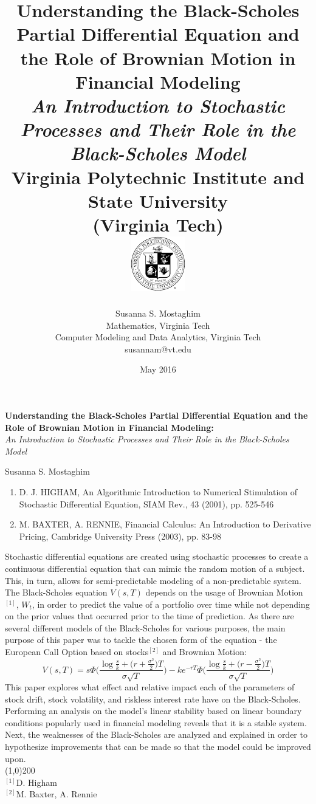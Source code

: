 \documentclass{report}
\title{
 	{\Huge\textbf{Understanding the Black-Scholes Partial Differential Equation and the Role of Brownian Motion in Financial Modeling} \\ \large \textit{An Introduction to Stochastic Processes and Their Role in the Black-Scholes Model}}\\\vspace{0.5cm}
 	{\large Virginia Polytechnic Institute and State University}\\
 	{\normalsize(Virginia Tech)\\}
 	\vspace{0.5cm}
 	{\includegraphics{vtcrest}}}
\author{Susanna S. Mostaghim \\ Mathematics, Virginia Tech\\ Computer Modeling and Data Analytics, Virginia Tech\\ susannam@vt.edu }
\date{May 2016}
\begin{document}
	\maketitle
	\begin{flushleft}
		\Large{\textbf{Understanding the Black-Scholes Partial Differential Equation and the Role of Brownian Motion in Financial Modeling:}}\\ 
		\normalsize{\textit{An Introduction to Stochastic Processes and Their Role in the Black-Scholes Model}}				
	\end{flushleft}
	\begin{flushright}
		\noindent\makebox[\linewidth]{\rule{6.5in}{0.6pt}}
		\large Susanna S. Mostaghim
	\end{flushright}
	\begin{flushleft}
		\begin{enumerate}
			\item[] \small D. J. HIGHAM, An Algorithmic Introduction to Numerical Stimulation of Stochastic Differential Equation, SIAM Rev., 43 (2001), pp. 525-546
			\item[] M. BAXTER, A. RENNIE, Financial Calculus: An Introduction to Derivative Pricing, Cambridge University Press (2003), pp. 83-98
		\end{enumerate}
		\vspace{0.15cm}
		Stochastic differential equations are created using stochastic processes to create a continuous differential equation that can mimic the random motion of a subject. This, in turn, allows for semi-predictable modeling of a non-predictable system. The Black-Scholes equation $V(s,T)$ depends on the usage of Brownian Motion$^{[1]}$, $W_t$, in order to predict the value of a portfolio over time while not depending on the prior values that occurred prior to the time of prediction. As there are several different models of the Black-Scholes for various purposes, the main purpose of this paper was to tackle the chosen form of the equation - the European Call Option based on stocks$^{[2]}$ and Brownian Motion:
		\[V(s,T) = s\Phi \Bigg(\frac{\log\frac{s}{k} + \big(r +\frac{\sigma^2}{2}\big)T}{\sigma\sqrt{T}} \Bigg) - ke^{-rT}\Phi\Bigg(\frac{\log\frac{s}{k} + \big(r - \frac{\sigma^2}{2}\big)T}{\sigma\sqrt{T}}\Bigg) \]
		This paper explores what effect and relative impact each of the parameters of stock drift, stock volatility, and riskless interest rate have on the Black-Scholes. Performing an analysis on the model's linear stability based on linear boundary conditions popularly used in financial modeling reveals that it is a stable system. Next, the weaknesses of the Black-Scholes are analyzed and explained in order to hypothesize improvements that can be made so that the model could be improved upon.
		\\
		\line(1,0){200}
		\\
		\hspace{0.25cm}\small $^{[1]}$D. Higham
		\\
		\hspace{0.25cm}$^{[2]}$M. Baxter, A. Rennie
		\noindent\makebox[\linewidth]{\rule{6.5in}{0.6pt}}
	\end{flushleft}	
	\normalsize
		
\end{document}
